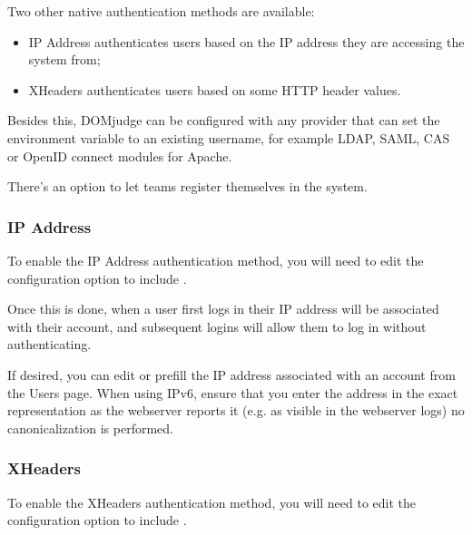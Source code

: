 \documentclass[a4paper,10pt,english,openany]{sphinxmanual}
\begin{document}
\sphinxAtStartPar
Two other native authentication methods are available:
\begin{itemize}
\item {} 
\sphinxAtStartPar
IP Address \sphinxhyphen{} authenticates users based on the IP address they are accessing
the system from;

\item {} 
\sphinxAtStartPar
X\sphinxhyphen{}Headers \sphinxhyphen{} authenticates users based on some HTTP header values.

\end{itemize}

\sphinxAtStartPar
Besides this, DOMjudge can be configured with any provider that can set
the environment variable  to an existing username,
for example LDAP, SAML, CAS or OpenID connect modules for Apache.

\sphinxAtStartPar
There’s an option to let teams register themselves in the system.


\subsubsection{IP Address}
\label{\detokenize{config-advanced:ip-address}}
\sphinxAtStartPar
To enable the IP Address authentication method, you will need to edit
the configuration option  to include .

\sphinxAtStartPar
Once this is done, when a user first logs in their IP address will be
associated with their account, and subsequent logins will allow them to log
in without authenticating.

\sphinxAtStartPar
If desired, you can edit or pre\sphinxhyphen{}fill the IP address associated with an
account from the Users page. When using IPv6, ensure that you enter the
address in the exact representation as the webserver reports it (e.g.
as visible in the webserver logs) \sphinxhyphen{} no canonicalization is performed.


\subsubsection{X\sphinxhyphen{}Headers}
\label{\detokenize{config-advanced:x-headers}}
\sphinxAtStartPar
To enable the X\sphinxhyphen{}Headers authentication method, you will need to edit
the configuration option  to include .
\end{document}
